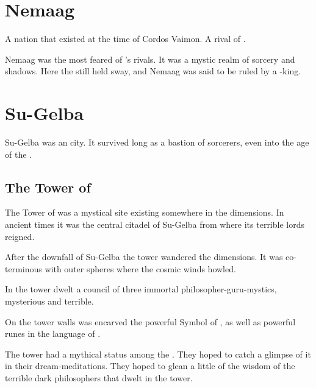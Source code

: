 \section{Nemaag}
A \scathaese nation that existed at the time of Cordos Vaimon. 
A rival of \Imrath. 

Nemaag was the most feared of \Imrath's rivals. 
It was a mystic realm of sorcery and shadows. 
Here the \ophidians still held sway, and Nemaag was said to be ruled by a \dragon-king. 















\section{Su-Gelba}
Su-Gelba was an \ophidian city.
It survived long as a bastion of sorcerers, even into the age of the \VaimonCaliphate. 









\subsection{The Tower of \Haamon}
The Tower of \Haamon was a mystical site existing somewhere in the dimensions. 
In ancient times it was the central citadel of Su-Gelba from where its terrible lords reigned. 

After the downfall of Su-Gelba the tower wandered the dimensions. 
It was co-terminous with outer spheres where the cosmic winds howled. 

In the tower dwelt a council of three immortal \ophidian philosopher-guru-mystics, mysterious and terrible. 

On the tower walls was encarved the powerful Symbol of \Haamon, as well as powerful runes in the language of . 

The tower had a mythical status among the \rethyaxes.
They hoped to catch a glimpse of it in their dream-meditations.
They hoped to glean a little of the wisdom of the terrible dark philosophers that dwelt in the tower. 















